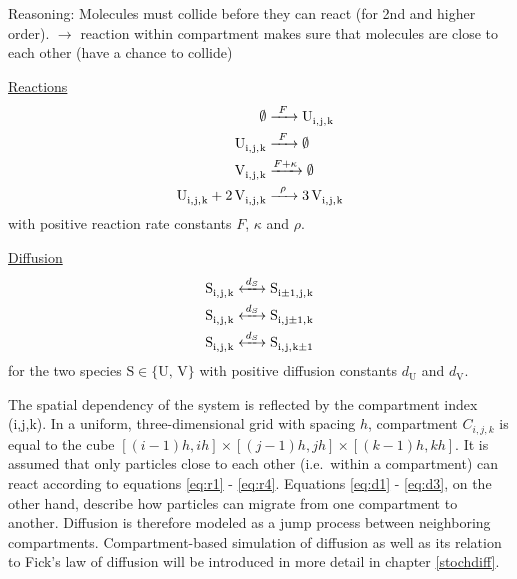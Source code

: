 Reasoning: Molecules must collide before they can react (for 2nd and higher order). $\rightarrow$ reaction within compartment makes sure that molecules are close to each other (have a chance to collide)

\underline{Reactions}
\begin{align}
\label{eq:r1}
\cee{\emptyset{} &->[F] U_{i,j,k}} \\
\label{eq:r2}
\cee{U_{i,j,k} &->[F] \emptyset} \\
\label{eq:r3}
\cee{V_{i,j,k} &->[F+\kappa] \emptyset} \\
\label{eq:r4}
\cee{U_{i,j,k} + 2V_{i,j,k} &->[\rho] 3V_{i,j,k}}
\end{align}
with positive reaction rate constants $F$, $\kappa$ and $\rho$.

\underline{Diffusion}
\begin{align}
\label{eq:d1}
\cee{S_{i,j,k} &<->[d_S] S_{i\pm{}1,j,k}} \\
\cee{S_{i,j,k} &<->[d_S] S_{i,j\pm{}1,k}} \\
\cee{S_{i,j,k} &<->[d_S] S_{i,j,k\pm{}1}}
\label{eq:d3}
\end{align}
for the two species $\text{S} \in \{\text{U, V}\}$ with positive diffusion constants $d_\text{U}$ and $d_\text{V}$. 

The spatial dependency of the system is reflected by the compartment index (i,j,k). In a uniform, three-dimensional grid with spacing $h$, compartment $C_{i,j,k}$ is equal to the cube $\left[(i-1)h,ih\right] \times \left[(j-1)h,jh\right] \times \left[(k-1)h,kh\right]$. It is assumed that only particles close to each other (i.e.\ within a compartment) can  react according to equations \eqref{eq:r1} - \eqref{eq:r4}. Equations \eqref{eq:d1} - \eqref{eq:d3}, on the other hand, describe how particles can migrate from one compartment to another. Diffusion is therefore modeled as a jump process between neighboring compartments. Compartment-based simulation of diffusion as well as its relation to Fick's law of diffusion will be introduced in more detail in chapter \eqref{stochdiff}. 
\fi